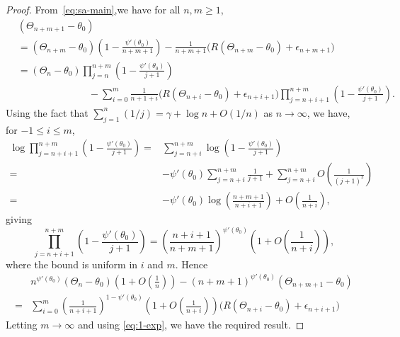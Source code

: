 \documentclass[12pt]{amsart}
\theoremstyle{plain}
\theoremstyle{remark}
\numberwithin{equation}{section}
\begin{document}
\begin{proof}
From~\eqref{eq:sa-main},we have for all $n,m \geq 1$,
\begin{align*}%
    &\left({\Theta}_{n+m+1} - \theta_0\right) \\ &= \left({\Theta_{n+m}} - \theta_0\right)\left(1 - \frac{\psi'(\theta_0)}{n+m+1}\right) - \frac{1}{n+m+1}\bigg( R(\Theta_{n+m}- \theta_0) + {\epsilon}_{n+m+1}\bigg)\\ 
    &= \left({\Theta_n} - \theta_0\right)\prod_{j=n}^{n+m}\left(1-\frac{\psi'(\theta_0)}{j+1}\right) \\ & \hspace{3cm}- \sum_{i=0}^m\frac{1}{n+1+i}\bigg(R(\Theta_{n+i}- \theta_0) + {\epsilon}_{n+i+1}\bigg)\prod_{j=n+i+1}^{n+m}\left(1-\frac{\psi'(\theta_0)}{j+1}\right).
\end{align*}
Using the fact that 
$\sum_{j=1}^{n}(1/j) = \gamma + \log n + O\left(1/n\right)$ as $n\to\infty$,
we have, for $-1 \leq i \leq m$,
\begin{align*}
    \log \prod_{j=n+i+1}^{n+m}\left(1-\frac{\psi'(\theta_0)}{j+1}\right) =
    & \sum_{j=n+i}^{n+m} \log \left(1-\frac{\psi'(\theta_0)}{j+1}\right)\\
    = & - \psi'(\theta_0) \sum_{j=n+i}^{n+m} \frac1{j+1} + 
    \sum_{j=n+i}^{n+m} O\left( \frac{1}{(j+1)^2}\right)\\
    = & - \psi'(\theta_0) \log \left(\frac{n+m+1}{n+i+1}\right) + O\left( \frac1{n+i}\right),
\end{align*}
giving
\[
   \prod_{j=n+i+1}^{n+m}\left(1-\frac{\psi'(\theta_0)}{j+1}\right) = \left(\frac{n+i+1}{n+m+1}\right)^{\psi'(\theta_0)}\left(1+O\left(\frac{1}{n+i}\right)\right),
\]
where the bound is uniform in $i$ and $m$. Hence
\begin{align*}%
    &{n}^{\psi'(\theta_0)}\left({\Theta_n} - \theta_0\right)\left(1+O\left(\frac{1}{n}\right)\right) - (n+m+1)^{\psi'(\theta_0)}\left({\Theta}_{n+m+1} - \theta_0\right) \\ =&
    \sum_{i=0}^m\left(\frac{1}{n+i+1}\right)^{1-\psi'(\theta_0)}\left(1+O\left(\frac{1}{n+i}\right)\right)\bigg(R(\Theta_{n+i}- \theta_0) + {\epsilon}_{n+i+1}\bigg) \end{align*}
{Letting $m \to \infty$} and using \eqref{eq:1-exp}, we have the required result.
\end{proof}
\end{document}
